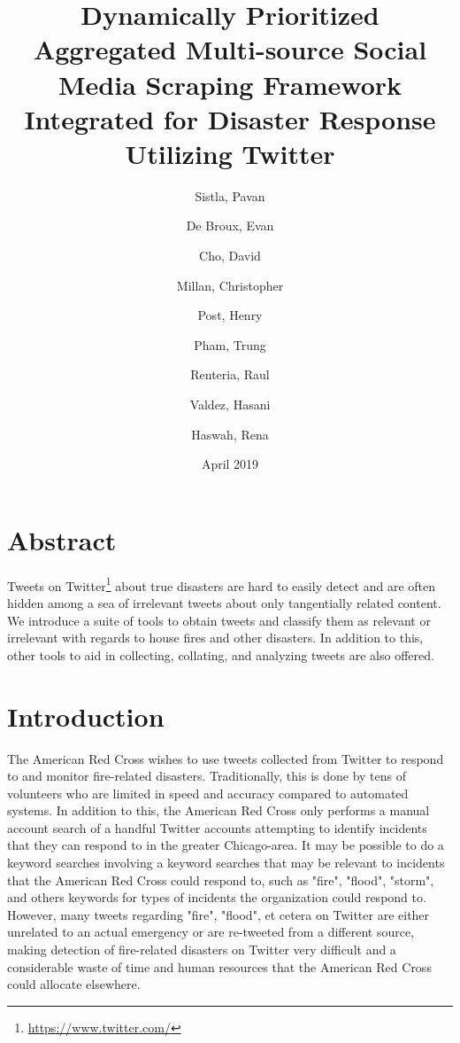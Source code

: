 \documentclass{article}
\title{
Dynamically Prioritized Aggregated
Multi-source Social Media Scraping
Framework Integrated for Disaster
Response Utilizing Twitter
}
\author{
Sistla, Pavan \and
De Broux, Evan \and
Cho, David \and
Millan, Christopher \and
Post, Henry \and
Pham, Trung \and
Renteria, Raul \and
Valdez, Hasani \and
Haswah, Rena \and
}
\date{April 2019}
\begin{document}
\maketitle

\section{Abstract}
Tweets on Twitter\footnote{\url{https://www.twitter.com/}} about true disasters are hard to easily detect and are often hidden among a sea of irrelevant tweets about only tangentially related content. We introduce a suite of tools to obtain tweets and classify them as relevant or irrelevant with regards to house fires and other disasters. In addition to this, other tools to aid in collecting, collating, and analyzing tweets are also offered. %


\section{Introduction}



The American Red Cross wishes to use tweets collected from Twitter to respond to and monitor fire-related disasters. Traditionally, this is done by tens of volunteers who are limited in speed and accuracy compared to automated systems. In addition to this, the American Red Cross only performs a manual account search of a handful Twitter accounts attempting to identify incidents that they can respond to in the greater Chicago-area. It may be possible to do a keyword searches involving a keyword searches that may be relevant to incidents that the American Red Cross could respond to, such as "fire", "flood", "storm", and others keywords for types of incidents the organization could respond to. However, many tweets regarding "fire", "flood", et cetera on Twitter are either unrelated to an actual emergency or are re-tweeted from a different source, making detection of fire-related disasters on Twitter very difficult and a considerable waste of time and human resources that the American Red Cross could allocate elsewhere.
\end{document}
